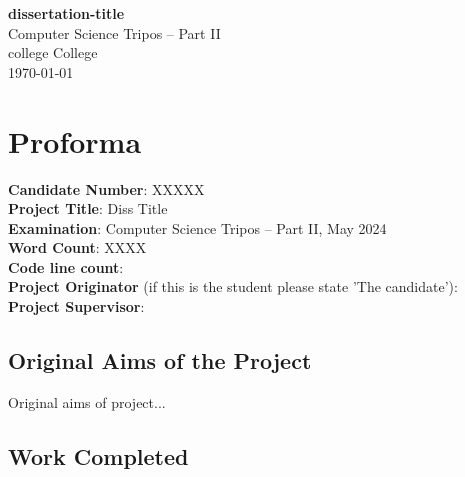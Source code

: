 \documentclass[12pt,a4paper,twoside,openright]{report}
\begin{document}


\pagestyle{empty}


\vspace*{60mm}
\begin{center}
\Huge
\textbf{dissertation-title} \\[5mm]
Computer Science Tripos -- Part II \\[5mm]
college College \\[5mm]
\today  %
\end{center}



\chapter*{Proforma}


\textbf{Candidate Number}: XXXXX \\
\textbf{Project Title}: Diss Title \\
\textbf{Examination}: Computer Science Tripos -- Part II, May 2024  \\
\textbf{Word Count}: XXXX \\
\textbf{Code line count}: \\
\textbf{Project Originator} (if this is the student please state 'The candidate'):  \\
\textbf{Project Supervisor}: \\




\section*{Original Aims of the Project}

Original aims of project...


\section*{Work Completed}
\end{document}
